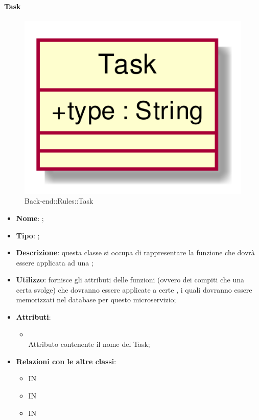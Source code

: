 \hypertarget{Task_label}{\paragraph{Task}}
\begin{figure}[h]
	\centering
	\includegraphics[width=\textwidth,height=\textheight,keepaspectratio]{images/ClassTask.png}
	\caption{Back-end::Rules::Task}
\end{figure}
\begin{itemize}
	\item \textbf{Nome}: ;
	\item \textbf{Tipo}: ;
	\item \textbf{Descrizione}: questa classe si occupa di rappresentare la funzione che dovrà essere applicata ad una ;
	\item \textbf{Utilizzo}: fornisce gli attributi delle funzioni (ovvero dei compiti che una certa  svolge) che dovranno essere applicate a certe , i quali dovranno essere memorizzati nel database per questo microservizio;
	\item \textbf{Attributi}:
	\begin{itemize}
		\item[]  \\
		Attributo contenente il nome del Task;
	\end{itemize}
	\item \textbf{Relazioni con le altre classi}:
	\begin{itemize}
		\item IN \hyperlink{TaskObserver_label}{}
		\item IN \hyperlink{TasksDAODynamoDB_label}{}
		\item IN \hyperlink{<<interface>> TasksDAO_label}{}
	\end{itemize}
\end{itemize}
\FloatBarrier

